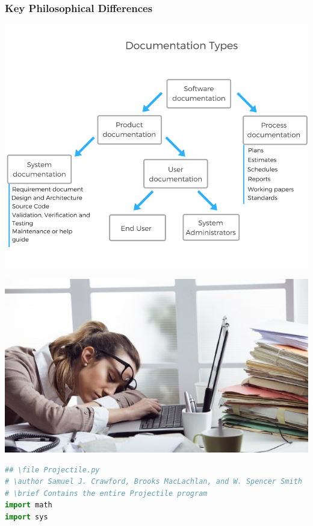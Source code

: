 \documentclass[usenames,dvipsnames,10pt]{beamer}
\begin{document}
\begin{frame}[fragile]
  
  \frametitle{Key Philosophical Differences}
\begin{minipage}{0.48\textwidth}
\includegraphics[width=1.0\textwidth]{DocKinds.png}
\end{minipage}
\begin{minipage}{0.48\textwidth}
\includegraphics[width=1.0\textwidth]{BoredAtWork.jpg}
\end{minipage}


\begin{lstlisting}[language=Python,basicstyle=\ttfamily\tiny,
  keywordstyle=bfseries,breaklines=false]
## \file Projectile.py
# \author Samuel J. Crawford, Brooks MacLachlan, and W. Spencer Smith
# \brief Contains the entire Projectile program
import math
import sys


\end{lstlisting}
\end{frame}
\end{document}
